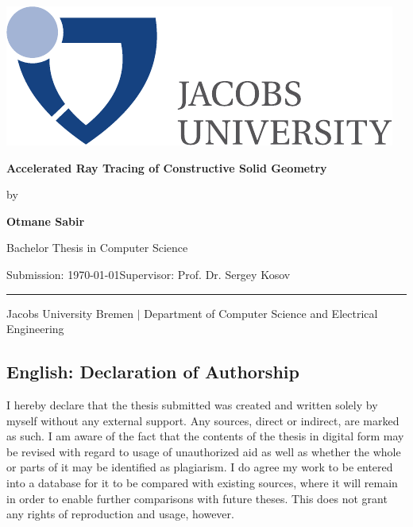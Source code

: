\documentclass[a4paper,11pt,oneside]{article}
\newcommand{\myname}{Otmane Sabir}
\newcommand{\mytitle}{Accelerated Ray Tracing of Constructive Solid Geometry}
\newcommand{\mysupervisor}{Prof. Dr. Sergey Kosov}
\begin{document}

\thispagestyle{empty}

\begin{flushright}
	\includegraphics[scale=0.8]{bsc-logo}
\end{flushright}
\vspace*{40mm}
\begin{center}
	\huge
	\textbf{\mytitle}
\end{center}
\vspace*{4mm}
\begin{center}
	\Large by
\end{center}
\vspace*{4mm}
\begin{center}
	\LARGE
	\textbf{\myname}
\end{center}
\vspace*{20mm}
\begin{center}
	\Large
	Bachelor Thesis in Computer Science
\end{center}
\vfill
\begin{flushleft}
	\large
	Submission: \today \hfill Supervisor: \mysupervisor \\
	\rule{\textwidth}{1pt}
\end{flushleft}
\begin{center}
	Jacobs University Bremen $|$ Department of Computer Science and Electrical Engineering
\end{center}

\newpage
\thispagestyle{empty}

\subsection*{English: Declaration of Authorship}
 
I hereby declare that the thesis submitted was created and written
solely by myself without any external support. Any sources, direct
or indirect, are marked as such. I am aware of the fact that the
contents of the thesis in digital form may be revised with regard to
usage of unauthorized aid as well as whether the whole or parts of
it may be identified as plagiarism. I do agree my work to be entered
into a database for it to be compared with existing sources, where
it will remain in order to enable further comparisons with future
theses. This does not grant any rights of reproduction and usage,
however.
\end{document}
